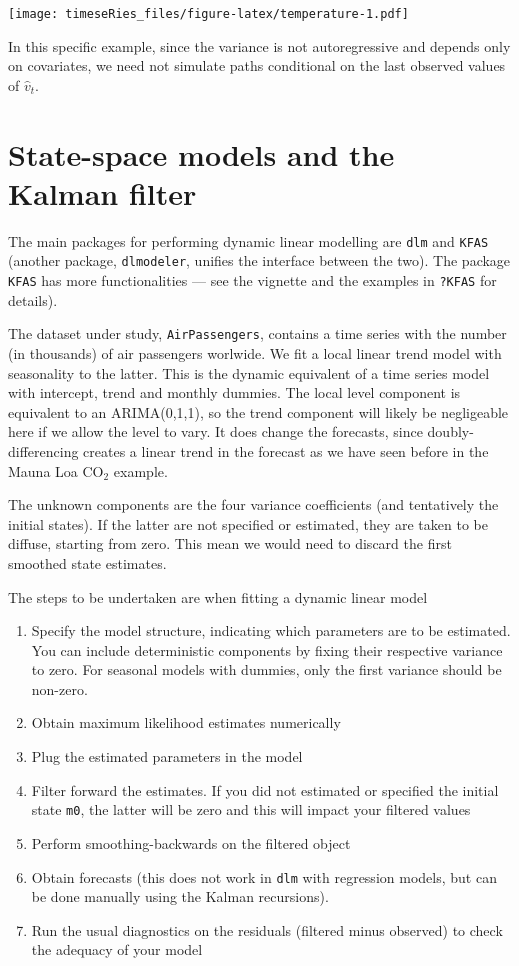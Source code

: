 \documentclass[]{book}
\providecommand{\tightlist}{%
  \setlength{\itemsep}{0pt}\setlength{\parskip}{0pt}}
\begin{document}
\texttt{[image: timeseRies\_files/figure-latex/temperature-1.pdf]}

In this specific example, since the variance is not autoregressive and
depends only on covariates, we need not simulate paths conditional on
the last observed values of \(\widehat{v}_t\).

\section{State-space models and the Kalman
filter}\label{state-space-models-and-the-kalman-filter}

The main packages for performing dynamic linear modelling are
\texttt{dlm} and \texttt{KFAS} (another package, \texttt{dlmodeler},
unifies the interface between the two). The package \texttt{KFAS} has
more functionalities --- see the vignette and the examples in
\texttt{?KFAS} for details).

The dataset under study, \texttt{AirPassengers}, contains a time series
with the number (in thousands) of air passengers worlwide. We fit a
local linear trend model with seasonality to the latter. This is the
dynamic equivalent of a time series model with intercept, trend and
monthly dummies. The local level component is equivalent to an
ARIMA(0,1,1), so the trend component will likely be negligeable here if
we allow the level to vary. It does change the forecasts, since
doubly-differencing creates a linear trend in the forecast as we have
seen before in the Mauna Loa CO\(_2\) example.

The unknown components are the four variance coefficients (and
tentatively the initial states). If the latter are not specified or
estimated, they are taken to be diffuse, starting from zero. This mean
we would need to discard the first smoothed state estimates.

The steps to be undertaken are when fitting a dynamic linear model

\begin{enumerate}
\def\labelenumi{\arabic{enumi}.}
\tightlist
\item
  Specify the model structure, indicating which parameters are to be
  estimated. You can include deterministic components by fixing their
  respective variance to zero. For seasonal models with dummies, only
  the first variance should be non-zero.
\item
  Obtain maximum likelihood estimates numerically
\item
  Plug the estimated parameters in the model
\item
  Filter forward the estimates. If you did not estimated or specified
  the initial state \texttt{m0}, the latter will be zero and this will
  impact your filtered values
\item
  Perform smoothing-backwards on the filtered object
\item
  Obtain forecasts (this does not work in \texttt{dlm} with regression
  models, but can be done manually using the Kalman recursions).
\item
  Run the usual diagnostics on the residuals (filtered minus observed)
  to check the adequacy of your model
\end{enumerate}
\end{document}
